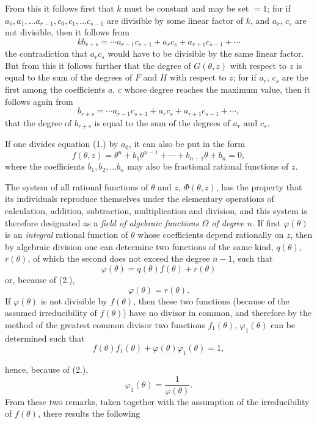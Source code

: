 \documentclass{article}
\begin{document}
From this it follows first that $k$ must be constant and may be set $=1$; for if $a_{0}, a_{1}, \ldots a_{r-1}, c_{0}, c_{1}, \ldots c_{s-1}$ are divisible by some linear factor of $k$, and $a_{r}$, $c_{s}$ are not divisible, then it follows from
\[ kb_{r+s} = \cdots a_{r-1}c_{s+1} + a_{r}c_{s} + a_{r+1}c_{s-1} + \cdots \]
the contradiction that $a_{r}c_{s}$ would have to be divisible by the same linear factor. But from this it follows further that the degree of $G(\theta, z)$ with respect to $z$ is equal to the sum of the degrees of $F$ and $H$ with respect to $z$; for if $a_{r}$, $c_{s}$ are the first among the coefficients $a$, $c$ whose degree reaches the maximum value, then it follows again from
\[ b_{r+s} = \cdots a_{r-1}c_{s+1} + a_{r}c_{s} + a_{r+1}c_{s-1} + \cdots, \]
that the degree of $b_{r+s}$ is equal to the sum of the degrees of $a_{r}$ and $c_{s}$.

If one divides equation (1.) by $a_{0}$, it can also be put in the form
\[ f(\theta, z) = \theta^{n} + b_{1}\theta^{n-1} + \cdots + b_{n-1}\theta + b_{n} = 0, \tag{2.} \]
where the coefficients $b_{1}, b_{2}, \ldots b_{n}$ may also be fractional rational functions of $z$.

The system of all rational functions of $\theta$ and $z$, $\Phi(\theta, z)$, has the property that its individuals reproduce themselves under the elementary operations of calculation, addition, subtraction, multiplication and division, and this system is therefore designated as a \emph{field of algebraic functions $\Omega$ of degree $n$}. If first $\varphi(\theta)$ is an \emph{integral} rational function of $\theta$ whose coefficients depend rationally on $z$, then by algebraic division one can determine two functions of the same kind, $q(\theta)$, $r(\theta)$, of which the second does not exceed the degree $n-1$, such that
\[ \varphi(\theta) = q(\theta)f(\theta) + r(\theta) \]
or, because of (2.),
\[ \varphi(\theta) = r(\theta). \]
If $\varphi(\theta)$ is not divisible by $f(\theta)$, then these two functions (because of the assumed irreducibility of $f(\theta)$) have no divisor in common, and therefore by the method of the greatest common divisor two functions $f_{1}(\theta)$, $\varphi_{1}(\theta)$ can be determined such that
\[ f(\theta)f_{1}(\theta) + \varphi(\theta)\varphi_{1}(\theta) = 1, \]

hence, because of (2.),
\[ \varphi_{1}(\theta) = \frac{1}{\varphi(\theta)}. \]
From these two remarks, taken together with the assumption of the irreducibility of $f(\theta)$, there results the following
\end{document}
